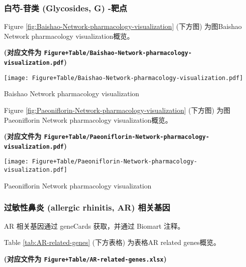\documentclass[
]{article}
\begin{document}
\hypertarget{ux767dux828d-ux82f7ux7c7b-glycosides-g--ux9776ux70b9}{%
\subsubsection{白芍-苷类 (Glycosides, G) -靶点}\label{ux767dux828d-ux82f7ux7c7b-glycosides-g--ux9776ux70b9}}

Figure \ref{fig:Baishao-Network-pharmacology-visualization} (下方图) 为图Baishao Network pharmacology visualization概览。

\textbf{(对应文件为 \texttt{Figure+Table/Baishao-Network-pharmacology-visualization.pdf})}

\def\@captype{figure}
\begin{center}
\texttt{[image: Figure+Table/Baishao-Network-pharmacology-visualization.pdf]}
\caption{Baishao Network pharmacology visualization}\label{fig:Baishao-Network-pharmacology-visualization}
\end{center}

Figure \ref{fig:Paeoniflorin-Network-pharmacology-visualization} (下方图) 为图Paeoniflorin Network pharmacology visualization概览。

\textbf{(对应文件为 \texttt{Figure+Table/Paeoniflorin-Network-pharmacology-visualization.pdf})}

\def\@captype{figure}
\begin{center}
\texttt{[image: Figure+Table/Paeoniflorin-Network-pharmacology-visualization.pdf]}
\caption{Paeoniflorin Network pharmacology visualization}\label{fig:Paeoniflorin-Network-pharmacology-visualization}
\end{center}

\hypertarget{ux8fc7ux654fux6027ux9f3bux708e-allergic-rhinitis-ar-ux76f8ux5173ux57faux56e0}{%
\subsubsection{过敏性鼻炎 (allergic rhinitis, AR) 相关基因}\label{ux8fc7ux654fux6027ux9f3bux708e-allergic-rhinitis-ar-ux76f8ux5173ux57faux56e0}}

AR 相关基因通过 geneCards 获取，并通过 Biomart 注释。

Table \ref{tab:AR-related-genes} (下方表格) 为表格AR related genes概览。

\textbf{(对应文件为 \texttt{Figure+Table/AR-related-genes.xlsx})}
\end{document}
